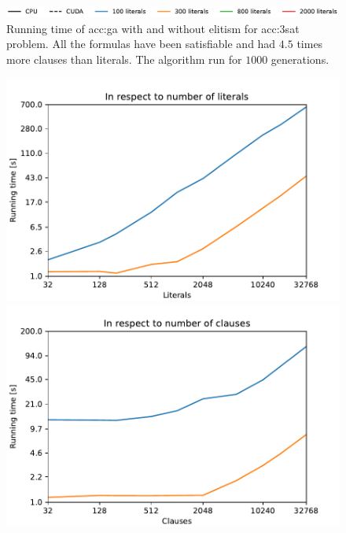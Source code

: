 \begin{figure}[ht!]
    \begin{minipage}[t]{0.7\textwidth}
        \includegraphics[width=\textwidth]{img/runs/time_ga_legend.pdf}
    \end{minipage}

    \caption[Genetic algorithm running time with and without elitism]{Running time of \acrlong{acc:ga} with and without elitism for \acrshort{acc:3sat} problem. All the formulas have been satisfiable and had $4.5$ times more clauses than literals. The algorithm run for $1000$ generations.}
\end{figure}

\begin{figure}[ht!]
    \centering
    \begin{minipage}[t]{0.9\textwidth}
        \begin{minipage}[t]{0.48\textwidth}
            \includegraphics[width=\textwidth]{img/runs/time_ga_varcount.pdf}
        \end{minipage}
        \begin{minipage}[t]{0.48\textwidth}
            \includegraphics[width=\textwidth]{img/runs/time_ga_clausecount.pdf}
        \end{minipage}
    \end{minipage}


\end{figure}

